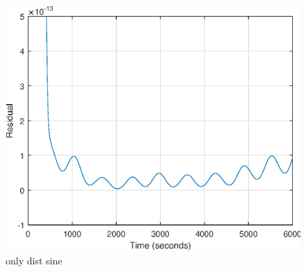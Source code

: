 \begin{figure}[H]
	\centering
	\includegraphics[width=0.7\linewidth]{figures/distonly_res}
	\caption{only dist sine}
	\label{fig:}
\end{figure}

